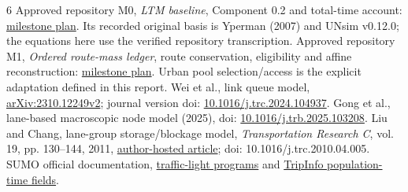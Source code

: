 \documentclass[10pt,a4paper]{article}
\newcommand{\head}[1]{\par\vspace{4pt}\noindent\textbf{#1}\par\nobreak\vspace{1pt}}
\begin{document}
\makeatletter
\renewcommand{\section}{\@ifstar{\head}{\head}}
\makeatother
\begin{thebibliography}{6}
\setlength{\itemsep}{0pt}\setlength{\parskip}{0pt}
 Approved repository M0, \emph{LTM baseline}, Component 0.2 and
total-time account:
\href{../../../../docs/milestones/milestone_0_ltm_baseline.md}{milestone plan}.
Its recorded original basis is Yperman (2007) and UNsim v0.12.0;
the equations here use the verified repository transcription.
 Approved repository M1, \emph{Ordered route-mass ledger},
route conservation, eligibility and affine reconstruction:
\href{../../../../docs/milestones/milestone_1_ordered_route_mass_ledger.md}
{milestone plan}. Urban pool selection/access is the explicit adaptation
defined in this report.
 Wei et al., link queue model,
\href{https://arxiv.org/html/2310.12249v2}{arXiv:2310.12249v2};
journal version doi:
\href{https://doi.org/10.1016/j.trc.2024.104937}{10.1016/j.trc.2024.104937}.
 Gong et al., lane-based macroscopic node model (2025),
doi: \href{https://doi.org/10.1016/j.trb.2025.103208}
{10.1016/j.trb.2025.103208}.
 Liu and Chang, lane-group storage/blockage model,
\emph{Transportation Research C}, vol. 19, pp. 130--144, 2011,
\href{https://attap.umd.edu/wp-content/uploads/2022/05/TRC522.pdf}
{author-hosted article}; doi: 10.1016/j.trc.2010.04.005.
 SUMO official documentation,
\href{https://sumo.dlr.de/docs/Simulation/Traffic_Lights.html}
{traffic-light programs} and
\href{https://sumo.dlr.de/docs/Simulation/Output/TripInfo.html}
{TripInfo population-time fields}.
\end{thebibliography}
\end{document}
